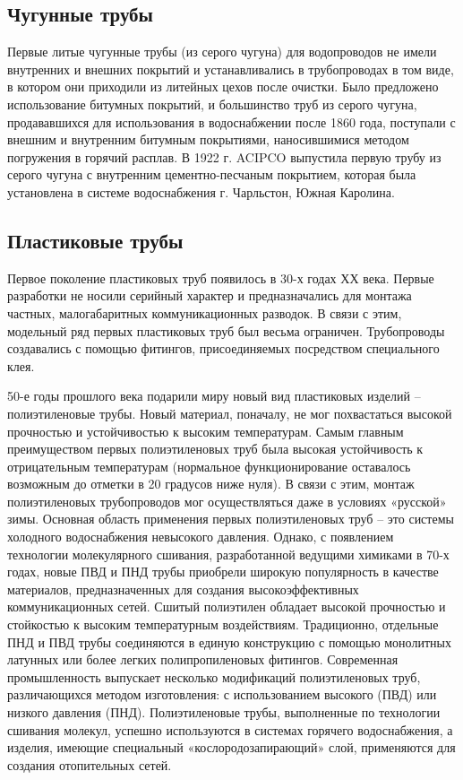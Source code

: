 \documentclass[a4paper,12pt,russian]{report}
\begin{document}
\subsection{Чугунные трубы}

Первые литые чугунные трубы (из серого чугуна)  для водопроводов не имели внутренних и внешних покрытий и устанавливались в трубопроводах в том виде, в котором они приходили из литейных цехов после очистки. Было предложено использование битумных покрытий, и большинство труб из серого чугуна, продававшихся для использования в водоснабжении после 1860 года, поступали с внешним и внутренним битумным покрытиями, наносившимися методом погружения в горячий расплав.  В 1922 г. ACIPCO выпустила первую трубу из серого чугуна с внутренним цементно-песчаным покрытием, которая была установлена в системе водоснабжения г. Чарльстон, Южная Каролина.

\subsection{Пластиковые трубы}

Первое поколение пластиковых труб появилось в 30-х годах ХХ века. Первые разработки не носили серийный характер и предназначались для монтажа частных, малогабаритных коммуникационных разводок. В связи с этим, модельный ряд первых пластиковых труб был весьма ограничен. Трубопроводы создавались с помощью фитингов, присоединяемых посредством специального клея.

50-е годы прошлого века подарили миру новый вид пластиковых изделий – полиэтиленовые трубы. Новый материал, поначалу, не мог похвастаться высокой прочностью и устойчивостью к высоким температурам. Самым главным преимуществом первых полиэтиленовых труб была высокая устойчивость к отрицательным температурам (нормальное функционирование оставалось возможным до отметки в 20 градусов ниже нуля). В связи с этим, монтаж полиэтиленовых трубопроводов мог осуществляться даже в условиях «русской» зимы. Основная область применения первых полиэтиленовых труб – это системы холодного водоснабжения невысокого давления. Однако, с появлением технологии молекулярного сшивания, разработанной ведущими химиками в 70-х годах, новые ПВД и ПНД трубы приобрели широкую популярность в качестве материалов, предназначенных для создания высокоэффективных коммуникационных сетей. Сшитый полиэтилен обладает высокой прочностью и стойкостью к высоким температурным воздействиям. Традиционно, отдельные ПНД и ПВД трубы соединяются в единую конструкцию с помощью монолитных латунных или более легких полипропиленовых фитингов. Современная промышленность выпускает несколько модификаций полиэтиленовых труб, различающихся методом изготовления: с использованием высокого (ПВД) или низкого давления (ПНД). Полиэтиленовые трубы, выполненные по технологии сшивания молекул, успешно используются в системах горячего водоснабжения, а изделия, имеющие специальный «кослородозапирающий» слой, применяются для создания отопительных сетей.
\end{document}

